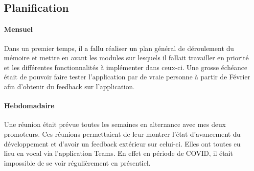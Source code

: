 \documentclass{EPL-master-thesis-covers-FR}
\begin{document}
			
			
		
		


			\subsection*{Planification}
				\label{sec:planification}
				
				\paragraph*{Mensuel}
				Dans un premier temps, il a fallu réaliser un plan général de déroulement du mémoire et mettre en avant les modules sur lesquels il fallait travailler en priorité et les différentes fonctionnalités à implémenter dans ceux-ci. Une grosse échéance était de pouvoir faire tester l'application par de vraie personne à partir de Février afin d'obtenir du feedback sur l'application.
				
				
				\paragraph*{Hebdomadaire} 
				Une réunion était prévue toutes les semaines en alternance avec mes deux promoteurs. Ces réunions permettaient de leur montrer l'état d'avancement du développement et d'avoir un feedback extérieur sur celui-ci. Elles ont toutes eu lieu en vocal via l'application Teams. En effet en période de COVID, il était impossible de se voir régulièrement en présentiel.
				
\end{document}
